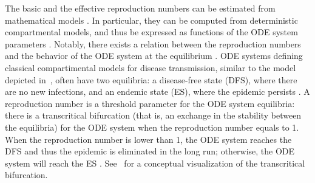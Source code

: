 The basic and the effective reproduction numbers can be estimated from mathematical models \cite[]{Ridenhour2018}. In particular, they can be computed from deterministic compartmental models, and thus be expressed as functions of the ODE system parameters \cite[]{Heffernan2005}. Notably, there exists a relation between the reproduction numbers and the behavior of the ODE system at the equilibrium \cite[]{VanDenDriessche2002,VanDenDriessche2008}. ODE systems defining classical compartimental models for disease transmission, similar to the model depicted in~, often have two equilibria: a disease-free state (DFS), where there are no new infections, and an endemic state (ES), where the epidemic persists \cite[]{Hethcote2000,VanDenDriessche2002}. A reproduction number is a threshold parameter for the ODE system equilibria: there is a transcritical bifurcation (that is, an exchange in the stability between the equilibria) for the ODE system when the reproduction number equals to 1. When the reproduction number is lower than 1, the ODE system reaches the DFS and thus the epidemic is eliminated in the long run; otherwise, the ODE system will reach the ES \cite[]{Hethcote2000,VanDenDriessche2002}. See~ for a conceptual visualization of the transcritical bifurcation.

